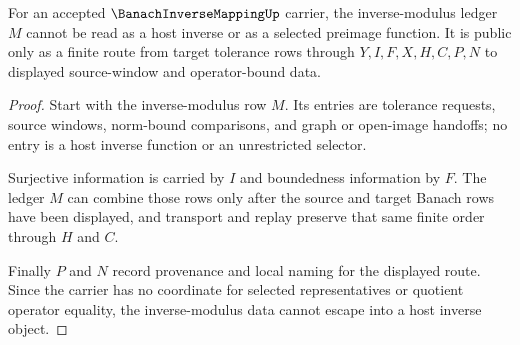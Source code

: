 \begin{theorem}
\label{thm:banach-inverse-mapping-inverse-modulus-nonescape}
For an accepted $\BanachInverseMappingUp$ carrier, the inverse-modulus ledger $M$ cannot be read as a host inverse or as a selected preimage function. It is public only as a finite route from target tolerance rows through $Y,I,F,X,H,C,P,N$ to displayed source-window and operator-bound data.
\end{theorem}
\begin{proof}
Start with the inverse-modulus row $M$. Its entries are tolerance requests, source windows, norm-bound comparisons, and graph or open-image handoffs; no entry is a host inverse function or an unrestricted selector.

Surjective information is carried by $I$ and boundedness information by $F$. The ledger $M$ can combine those rows only after the source and target Banach rows have been displayed, and transport and replay preserve that same finite order through $H$ and $C$.

Finally $P$ and $N$ record provenance and local naming for the displayed route. Since the carrier has no coordinate for selected representatives or quotient operator equality, the inverse-modulus data cannot escape into a host inverse object.
\end{proof}




